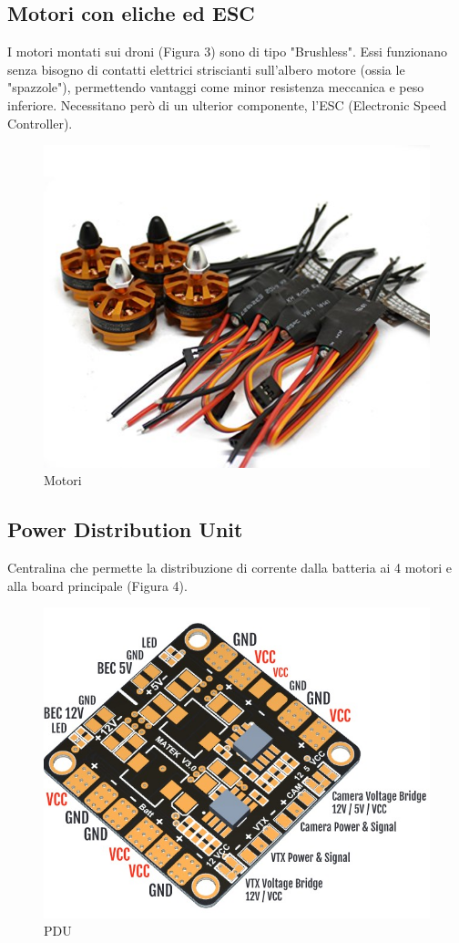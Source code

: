 \documentclass[]{article}
\begin{document}
\subsection{Motori con eliche ed ESC}
I motori montati sui droni (Figura 3) sono di tipo "Brushless". Essi funzionano senza bisogno di contatti elettrici striscianti sull'albero motore (ossia le "spazzole"), permettendo vantaggi come minor resistenza meccanica e peso inferiore. Necessitano però di un ulterior componente, l'ESC (Electronic Speed Controller).
\begin{figure}[!htpb]
\centering
\includegraphics[scale=0.3]{figura3.jpg}
\caption{Motori}
\label{figura3}
\end{figure}
\subsection{Power Distribution Unit}
Centralina che permette la distribuzione di corrente dalla batteria ai 4 motori e alla board principale (Figura 4).
\begin{figure}[!htpb]
\centering
\includegraphics[scale=0.3]{figura4.png}
\caption{PDU}
\label{figura4}
\end{figure}
\end{document}

